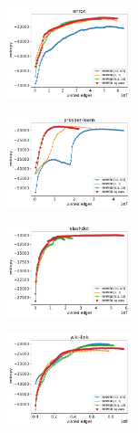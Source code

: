 \begin{subfigure}                                                                        
     \centering                                                                          
         \includegraphics[width=0.32\textwidth]{fig/enron_fig__entropy}
\end{subfigure}
\begin{subfigure}
         \centering
      \includegraphics[width=0.32\textwidth]{fig/prosper-loans_fig__entropy}
\end{subfigure}                                                             
\begin{subfigure}                                                           
         \centering                                                         
      \includegraphics[width=0.32\textwidth]{fig/slashdot_fig__entropy}
\end{subfigure}                                                             
\begin{subfigure}                                                           
         \centering                                                         
      \includegraphics[width=0.32\textwidth]{fig/wiki-link_fig__entropy}
\end{subfigure}                                                             

